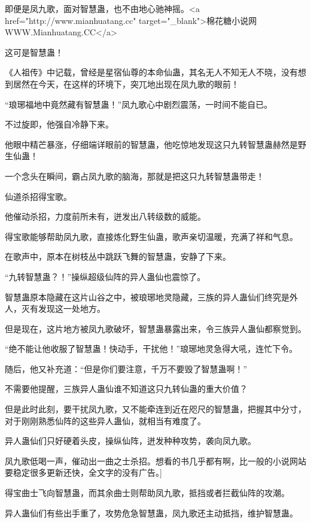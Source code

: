 
\begin{this_body}

即便是凤九歌，面对智慧蛊，也不由地心驰神摇。<a href="http://www.mianhuatang.cc" target="\_blank">棉花糖小说网WWW.Mianhuatang.CC</a>

这可是智慧蛊！

《人祖传》中记载，曾经是星宿仙尊的本命仙蛊，其名无人不知无人不晓，没有想到居然在今天，在这样的环境下，突兀地出现在凤九歌的眼前！

“琅琊福地中竟然藏有智慧蛊！”凤九歌心中剧烈震荡，一时间不能自已。

不过旋即，他强自冷静下来。

他眼中精芒暴涨，仔细端详眼前的智慧蛊，他吃惊地发现这只九转智慧蛊赫然是野生仙蛊！

一个念头在瞬间，霸占凤九歌的脑海，那就是把这只九转智慧蛊带走！

仙道杀招得宝歌。

他催动杀招，力度前所未有，迸发出八转级数的威能。

得宝歌能够帮助凤九歌，直接炼化野生仙蛊，歌声亲切温暖，充满了祥和气息。

在歌声中，原本在树枝丛中跳跃飞舞的智慧蛊，安静了下来。

“九转智慧蛊？！”操纵超级仙阵的异人蛊仙也震惊了。

智慧蛊原本隐藏在这片山谷之中，被琅琊地灵隐藏，三族的异人蛊仙们终究是外人，灭有发现这一处地方。

但是现在，这片地方被凤九歌破坏，智慧蛊暴露出来，令三族异人蛊仙都察觉到。

“绝不能让他收服了智慧蛊！快动手，干扰他！”琅琊地灵急得大吼，连忙下令。

随后，他又补充道：“但是你们要注意，千万不要毁了智慧蛊啊！”

不需要他提醒，三族异人蛊仙谁不知道这只九转仙蛊的重大价值？

但是此时此刻，要干扰凤九歌，又不能牵连到近在咫尺的智慧蛊，把握其中分寸，对于刚刚熟悉仙阵的这些异人蛊仙，就相当有难度了。

异人蛊仙们只好硬着头皮，操纵仙阵，迸发种种攻势，袭向凤九歌。

凤九歌低喝一声，催动出一曲之士杀招。想看的书几乎都有啊，比一般的小说网站要稳定很多更新还快，全文字的没有广告。]

得宝曲士飞向智慧蛊，而其余曲士则帮助凤九歌，抵挡或者拦截仙阵的攻潮。

异人蛊仙们有些出手重了，攻势危急智慧蛊，凤九歌还主动抵挡，维护智慧蛊。


\end{this_body}
